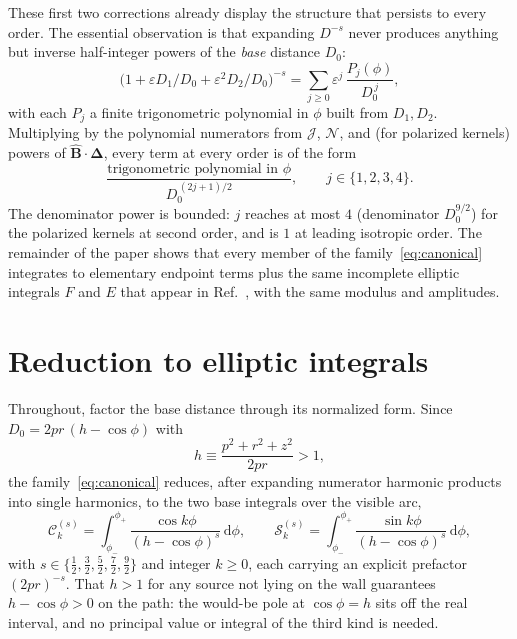 \documentclass[11pt]{article}
\newcommand{\Del}{\bm{\Delta}}
\newcommand{\Bhat}{\hat{\bm{B}}}
\newcommand{\eps}{\varepsilon}
\newcommand{\dd}{\,\mathrm{d}}
\newcommand{\Ck}[2]{\mathcal{C}^{(#2)}_{#1}}
\newcommand{\Sk}[2]{\mathcal{S}^{(#2)}_{#1}}
\begin{document}
These first two corrections already display the structure that persists to every order. The essential observation is that expanding $D^{-s}$ never produces anything but inverse half-integer powers of the \emph{base} distance $D_0$:
\begin{equation}
\big(1+\eps D_1/D_0+\eps^2 D_2/D_0\big)^{-s}
=\sum_{j\ge0}\eps^{j}\,\frac{P_j(\phi)}{D_0^{\,j}},
\end{equation}
with each $P_j$ a finite trigonometric polynomial in $\phi$ built from $D_1,D_2$. Multiplying by the polynomial numerators from $\mathcal{J}$, $\mathcal{N}$, and (for polarized kernels) powers of $\Bhat\cdot\Del$, every term at every order is of the form
\begin{equation}
\frac{\text{trigonometric polynomial in }\phi}{D_0^{\,(2j+1)/2}},\qquad j\in\{1,2,3,4\}.
\label{eq:canonical}
\end{equation}
The denominator power is bounded: $j$ reaches at most $4$ (denominator $D_0^{9/2}$) for the polarized kernels at second order, and is $1$ at leading isotropic order. The remainder of the paper shows that every member of the family~\eqref{eq:canonical} integrates to elementary endpoint terms plus the same incomplete elliptic integrals $F$ and $E$ that appear in Ref.~\cite{schwartz2025}, with the same modulus and amplitudes.

\section{Reduction to elliptic integrals}
\label{sec:reduction}

Throughout, factor the base distance through its normalized form. Since $D_0=2pr\,(h-\cos\phi)$ with
\begin{equation}
h\equiv\frac{p^2+r^2+z^2}{2pr}>1,
\label{eq:h}
\end{equation}
the family~\eqref{eq:canonical} reduces, after expanding numerator harmonic products into single harmonics, to the two base integrals over the visible arc,
\begin{equation}
\Ck{k}{s}=\int_{\phi_-}^{\phi_+}\frac{\cos k\phi}{(h-\cos\phi)^{s}}\dd\phi,
\qquad
\Sk{k}{s}=\int_{\phi_-}^{\phi_+}\frac{\sin k\phi}{(h-\cos\phi)^{s}}\dd\phi,
\label{eq:CkSk}
\end{equation}
with $s\in\{\tfrac12,\tfrac32,\tfrac52,\tfrac72,\tfrac92\}$ and integer $k\ge0$, each carrying an explicit prefactor $(2pr)^{-s}$. That $h>1$ for any source not lying on the wall guarantees $h-\cos\phi>0$ on the path: the would-be pole at $\cos\phi=h$ sits off the real interval, and no principal value or integral of the third kind is needed.
\end{document}

